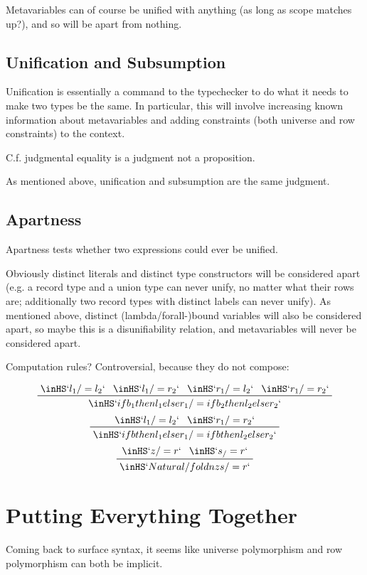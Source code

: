 \documentclass[11pt, twoside, reqno]{book}
\begin{document}
Metavariables can of course be unified with anything (as long as scope matches up?), and so will be apart from nothing.

\section{Unification and Subsumption}
Unification is essentially a command to the typechecker to do what it needs to make two types be the same.
In particular, this will involve increasing known information about metavariables and adding constraints (both universe and row constraints) to the context.

C.f. judgmental equality is a judgment not a proposition.

As mentioned above, unification and subsumption are the same judgment.



\section{Apartness}
Apartness tests whether two expressions could ever be unified.

Obviously distinct literals and distinct type constructors will be considered apart (e.g. a record type and a union type can never unify, no matter what their rows are; additionally two record types with distinct labels can never unify).
As mentioned above, distinct (lambda/forall-)bound variables will also be considered apart, so maybe this is a disunifiability relation, and metavariables will never be considered apart.

Computation rules?
Controversial, because they do not compose:

\begin{displaymath}
\prftree{\inHS`l_1 /= l_2`}{\inHS`l_1 /= r_2`}{\inHS`r_1 /= l_2`}{\inHS`r_1 /= r_2`}{\inHS`if b_1 then l_1 else r_1 /= if b_2 then l_2 else r_2`}
\end{displaymath}
\begin{displaymath}
\prftree{\inHS`l_1 /= l_2`}{\inHS`r_1 /= r_2`}{\inHS`if b then l_1 else r_1 /= if b then l_2 else r_2`}
\end{displaymath}
\begin{displaymath}
\prftree{\inHS`z /= r`}{\inHS`s _ /= r`}{\inHS`Natural/fold n z s /= r`}
\end{displaymath}





\chapter{Putting Everything Together}
Coming back to surface syntax, it seems like universe polymorphism and row polymorphism can both be implicit.
\end{document}
